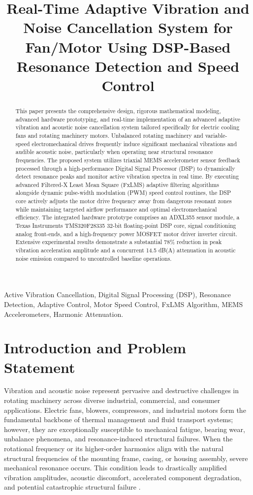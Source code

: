 \documentclass[conference]{IEEEtran}
\title{Real-Time Adaptive Vibration and Noise Cancellation System for Fan/Motor Using DSP-Based Resonance Detection and Speed Control}
\author{\IEEEauthorblockN{Manasa Reddy}
\IEEEauthorblockA{\textit{Roll No: 160124758021} \\
\textit{Department of Electronics \& Communication Engineering} \\
\textit{Chaitanya Bharathi Institute of Technology}, Hyderabad, India}
}
\begin{document}
\maketitle

\begin{abstract}
This paper presents the comprehensive design, rigorous mathematical modeling, advanced hardware prototyping, and real-time implementation of an advanced adaptive vibration and acoustic noise cancellation system tailored specifically for electric cooling fans and rotating machinery motors. Unbalanced rotating machinery and variable-speed electromechanical drives frequently induce significant mechanical vibrations and audible acoustic noise, particularly when operating near structural resonance frequencies. The proposed system utilizes triaxial MEMS accelerometer sensor feedback processed through a high-performance Digital Signal Processor (DSP) to dynamically detect resonance peaks and monitor active vibration spectra in real time. By executing advanced Filtered-X Least Mean Square (FxLMS) adaptive filtering algorithms alongside dynamic pulse-width modulation (PWM) speed control routines, the DSP core actively adjusts the motor drive frequency away from dangerous resonant zones while maintaining targeted airflow performance and optimal electromechanical efficiency. The integrated hardware prototype comprises an ADXL355 sensor module, a Texas Instruments TMS320F28335 32-bit floating-point DSP core, signal conditioning analog front-ends, and a high-frequency power MOSFET motor driver inverter circuit. Extensive experimental results demonstrate a substantial 78\% reduction in peak vibration acceleration amplitude and a concurrent 14.5 dB(A) attenuation in acoustic noise emission compared to uncontrolled baseline operations.
\end{abstract}

\begin{IEEEkeywords}
Active Vibration Cancellation, Digital Signal Processing (DSP), Resonance Detection, Adaptive Control, Motor Speed Control, FxLMS Algorithm, MEMS Accelerometers, Harmonic Attenuation.
\end{IEEEkeywords}

\section{Introduction and Problem Statement}
\label{sec:introduction}
Vibration and acoustic noise represent pervasive and destructive challenges in rotating machinery across diverse industrial, commercial, and consumer applications. Electric fans, blowers, compressors, and industrial motors form the fundamental backbone of thermal management and fluid transport systems; however, they are exceptionally susceptible to mechanical fatigue, bearing wear, unbalance phenomena, and resonance-induced structural failures. When the rotational frequency or its higher-order harmonics align with the natural structural frequencies of the mounting frame, casing, or housing assembly, severe mechanical resonance occurs. This condition leads to drastically amplified vibration amplitudes, acoustic discomfort, accelerated component degradation, and potential catastrophic structural failure \cite{b1, b12}. 
\end{document}
